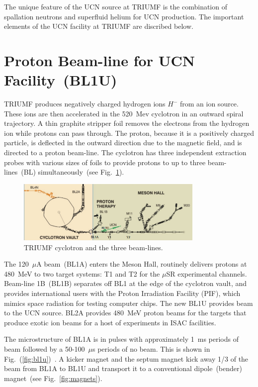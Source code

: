 The unique feature of the UCN source at TRIUMF is the combination of
spallation neutrons and superfluid helium for UCN production. The
important elements of the UCN facility at TRIUMF are discribed below.


\section{Proton Beam-line for UCN Facility~(BL1U)}
TRIUMF produces negatively charged hydrogen ions $H^-$ from an ion
source. These ions are then accelerated in the 520~Mev cyclotron in an
outward spiral trajectory. A thin graphite stripper foil removes the
electrons from the hydrogen ion while protons can pass through. The
proton, because it is a positively charged particle, is deflected in
the outward direction due to the magnetic field, and is directed to a
proton beam-line. The cyclotron has three independent extraction
probes with various sizes of foils to provide protons to up to three
beam-lines~(BL) simultaneously~(see Fig.~\ref{fig:cyclotron}).

\begin{figure}[h!]
  \centering
  \includegraphics[width=0.8\textwidth]{cyclotron.png}
  \caption{TRIUMF cyclotron and the three beam-lines.}
  \label{fig:cyclotron}
\end{figure}


The 120~$\mu$A beam~(BL1A) enters the Meson Hall, routinely delivers
protons at 480~MeV to two target systems: T1 and T2 for the $\mu$SR
experimental channels. Beam-line 1B~(BL1B) separates off BL1 at the
edge of the cyclotron vault, and provides international users with the
Proton Irradiation Facility (PIF), which mimics space radiation for
testing computer chips. The new BL1U provides beam to the UCN
source. BL2A provides 480~MeV proton beams for the targets that
produce exotic ion beams for a host of experiments in ISAC facilities.


The microstructure of BL1A is in pulses with approximately 1~ms
periods of beam followed by a 50-100~$\mu$s periods of no beam.  This
is shown in Fig.~(\ref{fig:bl1u})~\cite{Nick_thesis}. A kicker magnet
and the septum magnet kick away 1/3 of the beam from BL1A to BL1U and
transport it to a conventional dipole~(bender) magnet~(see
Fig.~\ref{fig:magnets}).

